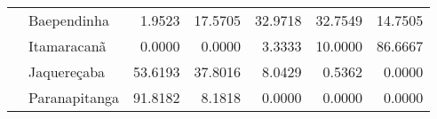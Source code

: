 \begin{table}[ht]
\begin{tabular}{ll rrrrr}
                          & Baependinha             &             1.9523 &      17.5705 &     32.9718 &    32.7549 &          14.7505 \\ 
                          & Itamaracanã             &             0.0000 &       0.0000 &      3.3333 &    10.0000 &          86.6667 \\ 
                          & Jaquereçaba             &            53.6193 &      37.8016 &      8.0429 &     0.5362 &           0.0000 \\ 
                          & Paranapitanga           &            91.8182 &       8.1818 &      0.0000 &     0.0000 &           0.0000 \\ 
   \bottomrule
\end{tabular}
\end{table}

